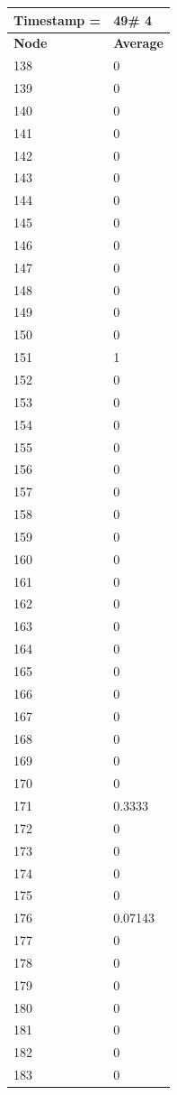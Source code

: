 \begin{tabular}{|l||l|}
\hline
\textbf{Timestamp =} & \textbf{49}\# 4\\\hline
	\textbf{Node} & \textbf{Average} \\ \hline
\hline
	138 & 0 \\ \hline
	139 & 0 \\ \hline
	140 & 0 \\ \hline
	141 & 0 \\ \hline
	142 & 0 \\ \hline
	143 & 0 \\ \hline
	144 & 0 \\ \hline
	145 & 0 \\ \hline
	146 & 0 \\ \hline
	147 & 0 \\ \hline
	148 & 0 \\ \hline
	149 & 0 \\ \hline
	150 & 0 \\ \hline
	151 & 1 \\ \hline
	152 & 0 \\ \hline
	153 & 0 \\ \hline
	154 & 0 \\ \hline
	155 & 0 \\ \hline
	156 & 0 \\ \hline
	157 & 0 \\ \hline
	158 & 0 \\ \hline
	159 & 0 \\ \hline
	160 & 0 \\ \hline
	161 & 0 \\ \hline
	162 & 0 \\ \hline
	163 & 0 \\ \hline
	164 & 0 \\ \hline
	165 & 0 \\ \hline
	166 & 0 \\ \hline
	167 & 0 \\ \hline
	168 & 0 \\ \hline
	169 & 0 \\ \hline
	170 & 0 \\ \hline
	171 & 0.3333 \\ \hline
	172 & 0 \\ \hline
	173 & 0 \\ \hline
	174 & 0 \\ \hline
	175 & 0 \\ \hline
	176 & 0.07143 \\ \hline
	177 & 0 \\ \hline
	178 & 0 \\ \hline
	179 & 0 \\ \hline
	180 & 0 \\ \hline
	181 & 0 \\ \hline
	182 & 0 \\ \hline
	183 & 0 \\ \hline
\end{tabular}
